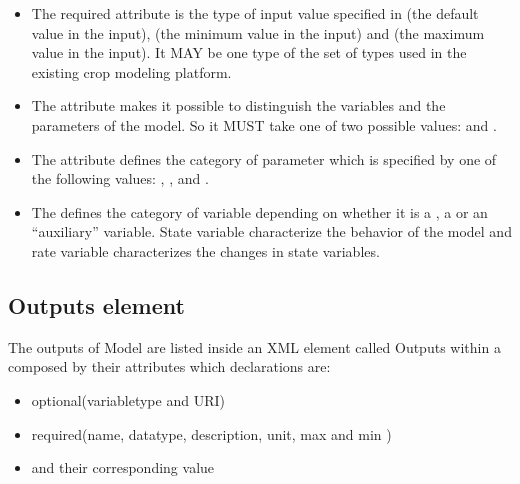 \documentclass[letterpaper,13pt,english]{sphinxmanual}
\begin{document}
\begin{itemize}
\item {} 
The required  attribute is the type of input value specified in  (the default value in the input),  (the minimum value in the input) and  (the maximum value in the input). It MAY be one type of the set of types used in the existing crop modeling platform.

\item {} 
The  attribute makes it possible to distinguish the variables and the parameters of the model. So it MUST take one of two possible values:  and .

\item {} 
The  attribute defines the category of parameter which is specified by one of the following values: , ,  and .

\item {} 
The  defines the category of variable depending on whether it is a , a  or an “auxiliary” variable.  State variable characterize the behavior of the model and rate variable characterizes the changes in state variables.

\end{itemize}


\subsection{Outputs element}
\label{\detokenize{user/description:outputs-element}}
The outputs of Model are listed inside an XML element called Outputs within a 
composed by their attributes which declarations are:
\begin{itemize}
\item {} 
optional(variabletype and URI)

\item {} 
required(name, datatype, description, unit, max and min )

\item {} 
and their corresponding value

\end{itemize}
\end{document}
